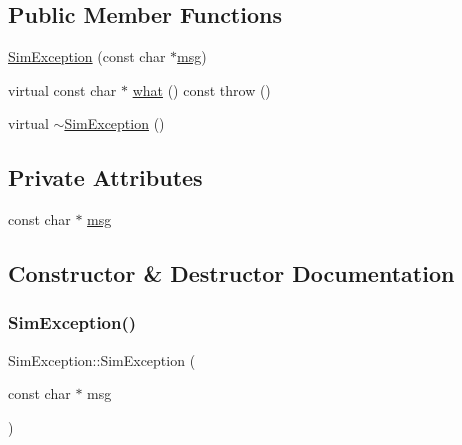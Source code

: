 \subsection*{Public Member Functions}
\begin{DoxyCompactItemize}
\item 
\mbox{\hyperlink{class_sim_exception_a69f32113e1b068189e85f76b0340d073}{Sim\+Exception}} (const char $\ast$\mbox{\hyperlink{class_sim_exception_a1b07ee928b1ece4a807801a14713148a}{msg}})
\item 
virtual const char $\ast$ \mbox{\hyperlink{class_sim_exception_a7b759030340d1299a2eeb40c6f67a926}{what}} () const  throw ()
\item 
virtual \mbox{\hyperlink{class_sim_exception_a116fdf6821f150a43cefffd66d2b6506}{$\sim$\+Sim\+Exception}} ()
\end{DoxyCompactItemize}
\subsection*{Private Attributes}
\begin{DoxyCompactItemize}
\item 
const char $\ast$ \mbox{\hyperlink{class_sim_exception_a1b07ee928b1ece4a807801a14713148a}{msg}}
\end{DoxyCompactItemize}


\subsection{Constructor \& Destructor Documentation}
\mbox{\label{class_sim_exception_a69f32113e1b068189e85f76b0340d073}} 
\subsubsection{\texorpdfstring{SimException()}{SimException()}}
{\footnotesize\ttfamily Sim\+Exception\+::\+Sim\+Exception (\begin{DoxyParamCaption}\item[{const char $\ast$}]{msg }\end{DoxyParamCaption})}

\mbox{\label{class_sim_exception_a116fdf6821f150a43cefffd66d2b6506}} 
